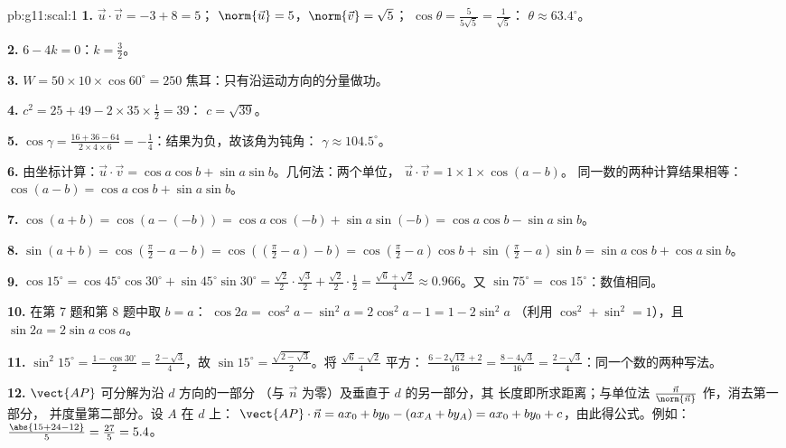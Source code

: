 \begin{solution}{pb:g11:scal:1}
\textbf{1.} $\vec u \cdot \vec v = -3 + 8 = 5$；
$\norm{\vec u} = 5$，$\norm{\vec v} = \sqrt5$；
$\cos\theta = \frac{5}{5\sqrt5} = \frac{1}{\sqrt5}$：
$\theta \approx 63.4^\circ$。

\textbf{2.} $6 - 4k = 0$：$k = \frac32$。

\textbf{3.} $W = 50 \times 10 \times \cos 60^\circ = 250$
焦耳：只有沿运动方向的分量做功。

\textbf{4.} $c^2 = 25 + 49 - 2 \times 35 \times \frac12 = 39$：
$c = \sqrt{39}$。

\textbf{5.} $\cos\gamma = \frac{16 + 36 - 64}{2 \times 4
\times 6} = -\frac14$：结果为负，故该角为钝角：
$\gamma \approx 104.5^\circ$。

\textbf{6.} 由坐标计算：$\vec u \cdot \vec v = \cos a \cos b +
\sin a \sin b$。几何法：两个单位，
$\vec u \cdot \vec v = 1 \times 1 \times \cos(a - b)$。
同一数的两种计算结果相等：
$\cos(a - b) = \cos a \cos b + \sin a \sin b$。

\textbf{7.} $\cos(a + b) = \cos(a - (-b)) = \cos a \cos(-b) +
\sin a \sin(-b) = \cos a \cos b - \sin a \sin b$。

\textbf{8.} $\sin(a + b) = \cos\left(\frac\pi2 - a - b\right)
= \cos\left(\left(\frac\pi2 - a\right) - b\right)
= \cos\left(\frac\pi2 - a\right)\cos b +
\sin\left(\frac\pi2 - a\right)\sin b
= \sin a \cos b + \cos a \sin b$。

\textbf{9.} $\cos 15^\circ = \cos 45^\circ \cos 30^\circ +
\sin 45^\circ \sin 30^\circ = \frac{\sqrt2}{2} \cdot
\frac{\sqrt3}{2} + \frac{\sqrt2}{2} \cdot \frac12 =
\frac{\sqrt6 + \sqrt2}{4} \approx 0.966$。又
$\sin 75^\circ = \cos 15^\circ$：数值相同。

\textbf{10.} 在第 7 题和第 8 题中取 $b = a$：
$\cos 2a = \cos^2 a - \sin^2 a = 2\cos^2 a - 1 = 1 - 2\sin^2 a$
（利用 $\cos^2 + \sin^2 = 1$），且
$\sin 2a = 2 \sin a \cos a$。

\textbf{11.} $\sin^2 15^\circ = \frac{1 - \cos 30^\circ}{2}
= \frac{2 - \sqrt3}{4}$，故
$\sin 15^\circ = \frac{\sqrt{2 - \sqrt3}}{2}$。将
$\frac{\sqrt6 - \sqrt2}{4}$ 平方：
$\frac{6 - 2\sqrt{12} + 2}{16} = \frac{8 - 4\sqrt3}{16} =
\frac{2 - \sqrt3}{4}$：同一个数的两种写法。

\textbf{12.} $\vect{AP}$ 可分解为沿 $d$ 方向的一部分
（与 $\vec n$ 为零）及垂直于 $d$ 的另一部分，其
长度即所求距离；与单位法
$\frac{\vec n}{\norm{\vec n}}$ 作，消去第一部分，
并度量第二部分。设 $A$ 在 $d$ 上：
$\vect{AP} \cdot \vec n = a x_0 + b y_0 - (a x_A + b y_A) =
a x_0 + b y_0 + c$，由此得公式。例如：
$\frac{\abs{15 + 24 - 12}}{5} = \frac{27}{5} = 5.4$。


\end{solution}
